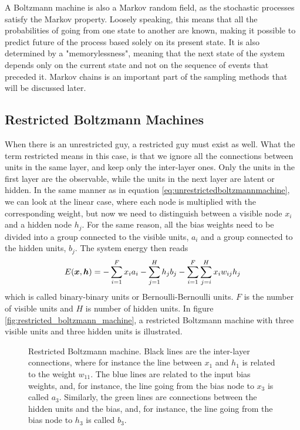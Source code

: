 A Boltzmann machine is also a Markov random field, as the stochastic processes satisfy the Markov property. Loosely speaking, this means that all the probabilities of going from one state to another are known, making it possible to predict future of the process based solely on its present state. It is also determined by a "memorylessness", meaning that the next state of the system depends only on the current state and not on the sequence of events that preceded it. \cite{fischer_training_2014} Markov chains is an important part of the sampling methods that will be discussed later. 

\subsection{Restricted Boltzmann Machines} \label{sec:RBM}
When there is an unrestricted guy, a restricted guy must exist as well. What the term restricted means in this case, is that we ignore all the connections between units in the same layer, and keep only the inter-layer ones. Only the units in the first layer are the observable, while the units in the next layer are latent or hidden. In the same manner as in equation \eqref{eq:unrestrictedboltzmannmachine}, we can look at the linear case, where each node is multiplied with the corresponding weight, but now we need to distinguish between a visible node $x_i$ and a hidden node $h_j$. For the same reason, all the bias weights need to be divided into a group connected to the visible units, $a_i$ and a group connected to the hidden units, $b_j$. The system energy then reads
\begin{equation}
E(\boldsymbol{{x}},\boldsymbol{{h}})=- \sum_{i=1}^Fx_ia_i- \sum_{j=1}^Hh_jb_j-\sum_{i=1}^F\sum_{j=i}^H x_iw_{ij}h_j 
\label{eq:binarybinary}
\end{equation}
which is called binary-binary units or Bernoulli-Bernoulli units. $F$ is the number of visible units and $H$ is number of hidden units. In figure \eqref{fig:restricted_boltzmann_machine}, a restricted Boltzmann machine with three visible units and three hidden units is illustrated.

\begin{figure}
	\centering
	
	\caption{Restricted Boltzmann machine. Black lines are the inter-layer connections, where for instance the line between $x_1$ and $h_1$ is related to the weight $w_{11}$. The blue lines are related to the input bias weights, and, for instance, the line going from the bias node to $x_3$ is called $a_3$. Similarly, the green lines are connections between the hidden units and the bias, and, for instance, the line going from the bias node to $h_3$ is called $b_3$.}
	\label{fig:restricted_boltzmann_machine}
\end{figure}

